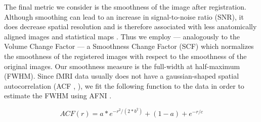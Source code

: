 \begin{sansmath}
\end{sansmath}

The final metric we consider is the smoothness of the image after registration.
Although smoothing can lead to an increase in signal-to-noise ratio (SNR), it does decrease spatial resolution and is therefore associated with less anatomically aligned images and statistical maps \cite{fmriprep}.
Thus we employ --- analogously to the Volume Change Factor --- a Smoothness Change Factor (SCF) which normalizes the smoothness of the registered images with respect to the smoothness of the original images.
Our smoothness measure is the full-width at half-maximum (FWHM).
Since fMRI data usually does not have a gaussian-shaped spatial autocorrelation (ACF \cite{eklund2016cluster}, \cite{cox2017fmri}), we fit the following function to the data in order to estimate the FWHM using AFNI \cite{cox1996afni}.

\begin{equation} \label{eq:acf}
        ACF(r)
        = a * e^{ -r^{2}/ (2 * b^{2}) } + (1 - a) + e^{-r/c}
\end{equation}

